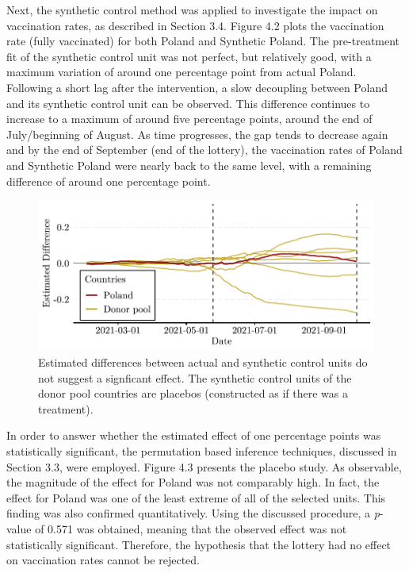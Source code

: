 \documentclass{scrbook}
\begin{document}
\vspace{-0.5cm}

Next, the synthetic control method was applied to investigate the impact
on vaccination rates, as described in Section 3.4. Figure 4.2 plots the
vaccination rate (fully vaccinated) for both Poland and Synthetic
Poland. The pre-treatment fit of the synthetic control unit was not
perfect, but relatively good, with a maximum variation of around one
percentage point from actual Poland. Following a short lag after the
intervention, a slow decoupling between Poland and its synthetic control
unit can be observed. This difference continues to increase to a maximum
of around five percentage points, around the end of July/beginning of
August. As time progresses, the gap tends to decrease again and by the
end of September (end of the lottery), the vaccination rates of Poland
and Synthetic Poland were nearly back to the same level, with a
remaining difference of around one percentage point.

\begin{figure}[h]
\caption[Placebo plot of Poland and donor pool]{Estimated differences between actual and synthetic control units do not suggest a signficant effect. The synthetic control units of the donor pool countries are placebos (constructed as if there was a treatment).}

\begin{center}\includegraphics{bachelor_thesis_files/figure-latex/unnamed-chunk-4-1} \end{center}
\end{figure}

\vspace{-0.2cm}

In order to answer whether the estimated effect of one percentage points
was statistically significant, the permutation based inference
techniques, discussed in Section 3.3, were employed. Figure 4.3 presents
the placebo study. As observable, the magnitude of the effect for Poland
was not comparably high. In fact, the effect for Poland was one of the
least extreme of all of the selected units. This finding was also
confirmed quantitatively. Using the discussed procedure, a
\textit{p}-value of 0.571 was obtained, meaning that the observed effect
was not statistically significant. Therefore, the hypothesis that the
lottery had no effect on vaccination rates cannot be rejected.
\end{document}
